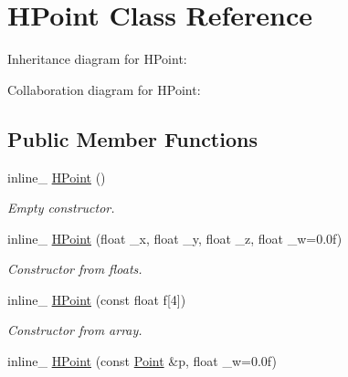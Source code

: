 \hypertarget{class_h_point}{\section{H\+Point Class Reference}
\label{class_h_point}
}


Inheritance diagram for H\+Point\+:


Collaboration diagram for H\+Point\+:
\subsection*{Public Member Functions}
\begin{DoxyCompactItemize}
\item 
\hypertarget{class_h_point_a5e3fe1aeb8ff13965d728803c7c6483c}{inline\+\_\+ \hyperlink{class_h_point_a5e3fe1aeb8ff13965d728803c7c6483c}{H\+Point} ()}\label{class_h_point_a5e3fe1aeb8ff13965d728803c7c6483c}

\begin{DoxyCompactList}\small\item\em Empty constructor. \end{DoxyCompactList}\item 
\hypertarget{class_h_point_ad7facedfb7132b6cffb9e6cd701aef0c}{inline\+\_\+ \hyperlink{class_h_point_ad7facedfb7132b6cffb9e6cd701aef0c}{H\+Point} (float \+\_\+x, float \+\_\+y, float \+\_\+z, float \+\_\+w=0.\+0f)}\label{class_h_point_ad7facedfb7132b6cffb9e6cd701aef0c}

\begin{DoxyCompactList}\small\item\em Constructor from floats. \end{DoxyCompactList}\item 
\hypertarget{class_h_point_a9735769e9ac56ee78ff4894b958eeb33}{inline\+\_\+ \hyperlink{class_h_point_a9735769e9ac56ee78ff4894b958eeb33}{H\+Point} (const float f\mbox{[}4\mbox{]})}\label{class_h_point_a9735769e9ac56ee78ff4894b958eeb33}

\begin{DoxyCompactList}\small\item\em Constructor from array. \end{DoxyCompactList}\item 
\hypertarget{class_h_point_a9e7098725fdb57d522055922b901cbb5}{inline\+\_\+ \hyperlink{class_h_point_a9e7098725fdb57d522055922b901cbb5}{H\+Point} (const \hyperlink{class_point}{Point} \&p, float \+\_\+w=0.\+0f)}\label{class_h_point_a9e7098725fdb57d522055922b901cbb5}


\end{DoxyCompactItemize}
